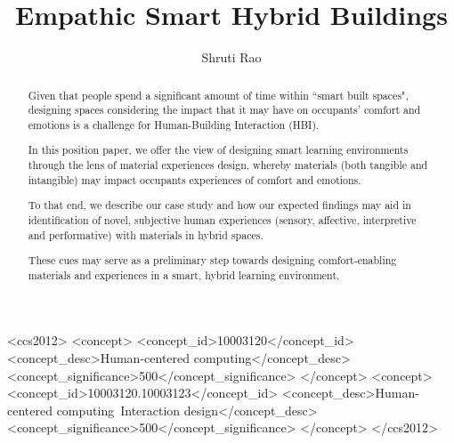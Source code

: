 \documentclass[manuscript, anonymous, review]{acmart}
\begin{document}
\title{Empathic Smart Hybrid Buildings}

\author{Shruti Rao}



\renewcommand{\shortauthors}{Rao et al.}

\begin{abstract}
Given that people spend a significant amount of time within ``smart built spaces", designing spaces considering the impact that it may have on occupants’ comfort and emotions is a challenge for Human-Building Interaction (HBI).

In this position paper, we offer the view of designing smart learning environments through the lens of material experiences design, whereby materials (both tangible and intangible) may impact occupants experiences of comfort and emotions.

To that end, we describe our case study and how our expected findings may aid in identification of novel, subjective human experiences (sensory, affective, interpretive and performative) with materials in hybrid spaces.

These cues may serve as a preliminary step towards designing comfort-enabling materials  and experiences in a smart, hybrid learning environment. 
\end{abstract}


\begin{CCSXML}
<ccs2012>
   <concept>
       <concept_id>10003120</concept_id>
       <concept_desc>Human-centered computing</concept_desc>
       <concept_significance>500</concept_significance>
       </concept>
   <concept>
       <concept_id>10003120.10003123</concept_id>
       <concept_desc>Human-centered computing~Interaction design</concept_desc>
       <concept_significance>500</concept_significance>
       </concept>
 </ccs2012>
\end{CCSXML}
\end{document}
